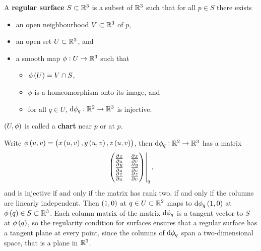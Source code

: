 \begin{definition}
A \textbf{regular surface} $ S \subset \mathbb{R}^3 $ is a subset of $ \mathbb{R}^3 $ such that for all $ p \in S $ there exists
\begin{itemize}
\item an open neighbourhood $ V \subset \mathbb{R}^3 $ of $ p $,
\item an open set $ U \subset \mathbb{R}^2 $, and
\item a smooth map $ \phi : U \to \mathbb{R}^3 $ such that
\begin{itemize}
\item $ \phi\br{U} = V \cap S $,
\item $ \phi $ is a homeomorphism onto its image, and
\item for all $ q \in U $, $ \mathrm{d}\phi_q : \mathbb{R}^2 \to \mathbb{R}^3 $ is injective.
\end{itemize}
\end{itemize}
$ \br{U, \phi} $ is called a \textbf{chart} near $ p $ or at $ p $.
\end{definition}

Write $ \phi\br{u, v} = \br{x\br{u, v}, y\br{u, v}, z\br{u, v}} $, then $ \mathrm{d}\phi_q : \mathbb{R}^2 \to \mathbb{R}^3 $ has a matrix
$$ \eval{\threebyone{\tpd{x}{u} & \tpd{x}{v}}{\tpd{y}{u} & \tpd{y}{v}}{\tpd{z}{u} & \tpd{z}{v}}}_q, $$
and is injective if and only if the matrix has rank two, if and only if the columns are linearly independent. Then $ \br{1, 0} $ at $ q \in U \subset \mathbb{R}^2 $ maps to $ \d\phi_q\br{1, 0} $ at $ \phi\br{q} \in S \subset \RR^3 $. Each column matrix of the matrix $ \mathrm{d}\phi_q $ is a tangent vector to $ S $ at $ \phi\br{q} $, so the regularity condition for surfaces ensures that a regular surface has a tangent plane at every point, since the columns of $ \mathrm{d}\phi_q $ span a two-dimensional space, that is a plane in $ \mathbb{R}^3 $.

